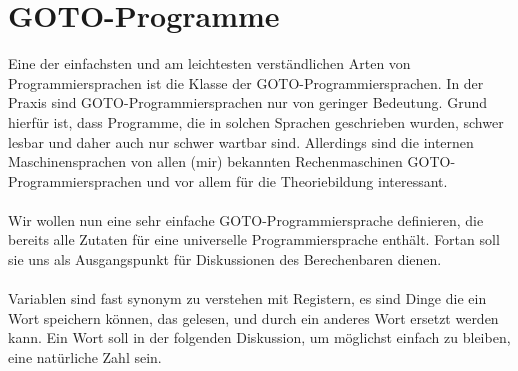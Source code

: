 \documentclass[11pt,a4paper,leqno]{report}
\numberwithin{equation}{chapter}
\begin{document}
\section{GOTO-Programme}
Eine der einfachsten und am leichtesten verst\"andlichen Arten von Programmiersprachen ist die Klasse der GOTO-Programmiersprachen. In der Praxis sind GOTO-Programmiersprachen nur von geringer Bedeutung. Grund hierf\"ur ist, dass Programme, die in solchen Sprachen geschrieben wurden, schwer lesbar und daher auch nur schwer wartbar sind. Allerdings sind die internen Maschinensprachen von allen (mir) bekannten Rechenmaschinen GOTO-Programmiersprachen und vor allem f\"ur die Theoriebildung interessant.\\
\\
Wir wollen nun eine sehr einfache GOTO-Programmiersprache definieren, die bereits alle Zutaten f\"ur eine universelle Programmiersprache enth\"alt. Fortan soll sie uns als Ausgangspunkt f\"ur  Diskussionen des Berechenbaren dienen.\\
\\
Variablen sind fast synonym zu verstehen mit Registern, es sind Dinge die ein Wort speichern k\"onnen, das gelesen, und durch ein anderes Wort ersetzt werden kann. Ein Wort soll in der folgenden Diskussion, um m\"oglichst einfach zu bleiben, eine nat\"urliche Zahl sein. \\
\end{document}

